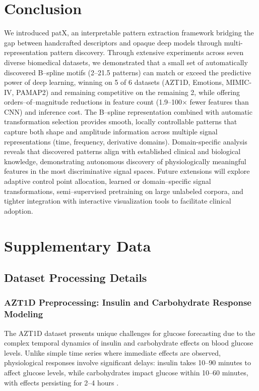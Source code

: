 \documentclass[11pt]{article}
\begin{document}
\section{Conclusion}
We introduced patX, an interpretable pattern extraction framework bridging the
gap between handcrafted descriptors and opaque deep models through
multi-representation pattern discovery.
Through extensive experiments across seven diverse biomedical datasets, we
demonstrated that a small set of automatically discovered B--spline motifs
(2--21.5 patterns) can match or exceed the predictive power of deep learning,
winning on 5 of 6 datasets (AZT1D, Emotions, MIMIC-IV, PAMAP2)
and remaining competitive on the remaining 2, while offering orders--of--magnitude
reductions in feature count (1.9--100× fewer features than CNN) and inference cost.
The B--spline representation combined with automatic transformation selection
provides smooth, locally controllable patterns that capture both shape and
amplitude information across multiple signal representations (time, frequency,
derivative domains).
Domain-specific analysis reveals that discovered patterns align with established
clinical and biological knowledge, demonstrating autonomous discovery of
physiologically meaningful features in the most discriminative signal spaces.
Future extensions will explore adaptive control point allocation, learned or
domain--specific signal transformations, semi--supervised pretraining on large
unlabeled corpora, and tighter integration with interactive visualization tools
to facilitate clinical adoption.




\section{Supplementary Data}

\subsection{Dataset Processing Details}

\subsubsection{AZT1D Preprocessing: Insulin and Carbohydrate Response Modeling}

The AZT1D dataset presents unique challenges for glucose forecasting due to the complex temporal dynamics of insulin and carbohydrate effects on blood glucose levels.
Unlike simple time series where immediate effects are observed, physiological responses involve significant delays: insulin takes 10--90 minutes to affect glucose levels, while carbohydrates impact glucose within 10--60 minutes, with effects persisting for 2--4 hours \cite{woldaregay2019data}.
\end{document}
